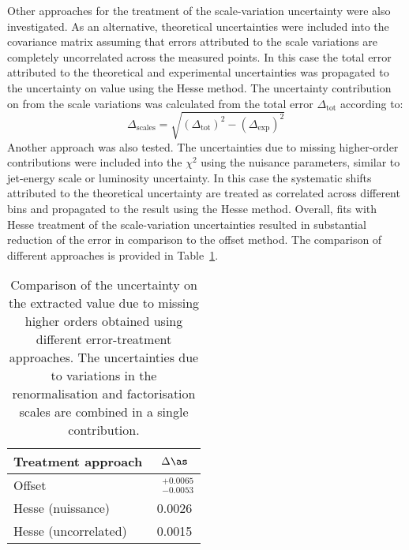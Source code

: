 Other approaches for the treatment of the scale-variation uncertainty were also investigated. As an alternative, theoretical uncertainties were included into the covariance matrix assuming that errors attributed to the scale variations are completely uncorrelated across the measured points. In this case the total error attributed to the theoretical and experimental uncertainties was propagated to the uncertainty on \asz value using the Hesse method. The uncertainty contribution on \as from the scale variations was calculated from the total error $\Delta_\text{tot}$ according to:
\begin{equation}
 \Delta_\text{scales} = \sqrt{\left(\Delta_\text{tot}\right)^2 - \left(\Delta_\text{exp}\right)^2}
 \label{eq:asuncscalecontrib}
\end{equation}
Another approach was also tested. The uncertainties due to missing higher-order contributions were included into the $\chi^2$ using the nuisance parameters, similar to jet-energy scale or luminosity uncertainty. In this case the systematic shifts attributed to the theoretical uncertainty are treated as correlated across different bins and propagated to the result using the Hesse method. Overall, fits with Hesse treatment of the scale-variation uncertainties resulted in substantial reduction of the \asz error in comparison to the offset method. The comparison of different approaches is provided in Table~\ref{tab:scaleuncvariants}.
\begin{table}[h]
\centering
\begin{tabular}{|l|c|}
 \hline
 Treatment approach & $\Delta\as$ \\
 \hline
 \hline
  Offset & $\phantom{x}^{+0.0065}_{-0.0053}$ \T\B \\
  Hesse (nuissance) & 0.0026 \\
  Hesse (uncorrelated) & 0.0015 \\
 \hline
\end{tabular}
\caption{Comparison of the uncertainty on the extracted \asz value due to missing higher orders obtained using different error-treatment approaches. The uncertainties due to variations in the renormalisation and factorisation scales are combined in a single contribution.}
\label{tab:scaleuncvariants}
\end{table}

